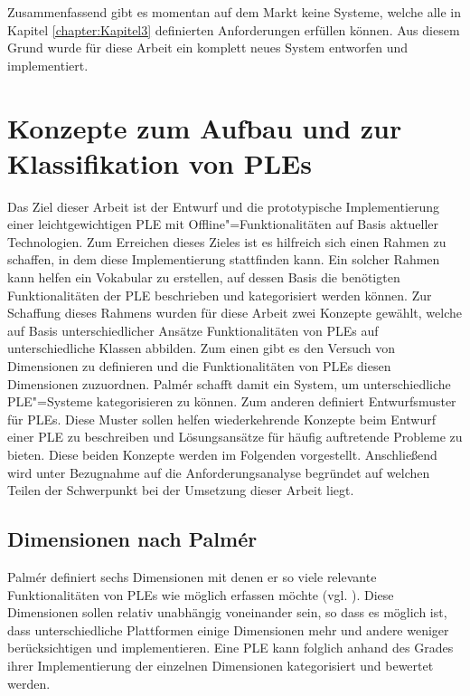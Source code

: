 Zusammenfassend gibt es momentan auf dem Markt keine Systeme, welche alle in Kapitel \ref{chapter:Kapitel3} definierten Anforderungen erfüllen können. Aus diesem Grund wurde für diese Arbeit ein komplett neues System entworfen und implementiert.

\section{Konzepte zum Aufbau und zur Klassifikation von \acsp{PLE}}
Das Ziel dieser Arbeit ist der Entwurf und die prototypische Implementierung einer leichtgewichtigen \ac{PLE} mit Offline"=Funktionalitäten auf Basis aktueller Technologien. Zum Erreichen dieses Zieles ist es hilfreich sich einen Rahmen zu schaffen, in dem diese Implementierung stattfinden kann. Ein solcher Rahmen kann helfen ein Vokabular zu erstellen, auf dessen Basis die benötigten Funktionalitäten der \ac{PLE} beschrieben und kategorisiert werden können. Zur Schaffung dieses Rahmens wurden für diese Arbeit zwei Konzepte gewählt, welche auf Basis unterschiedlicher Ansätze Funktionalitäten von \acp{PLE} auf unterschiedliche Klassen abbilden. Zum einen gibt es den Versuch von \cite{Palmer2009} Dimensionen zu definieren und die Funktionalitäten von \acp{PLE} diesen Dimensionen zuzuordnen. Palmér schafft damit ein System, um unterschiedliche \ac{PLE}"=Systeme kategorisieren zu können. Zum anderen definiert \cite{Wilson2008} Entwurfsmuster für \acp{PLE}. Diese Muster sollen helfen wiederkehrende Konzepte beim Entwurf einer \ac{PLE} zu beschreiben und Lösungsansätze für häufig auftretende Probleme zu bieten. Diese beiden Konzepte werden im Folgenden vorgestellt. Anschließend wird unter Bezugnahme auf die Anforderungsanalyse begründet auf welchen Teilen der Schwerpunkt bei der Umsetzung dieser Arbeit liegt.

\subsection{Dimensionen nach Palmér}\label{section:dimensions_palmer} 
Palmér definiert sechs Dimensionen mit denen er so viele relevante Funktionalitäten von \acp{PLE} wie möglich erfassen möchte (vgl. \cite{Palmer2009}). Diese Dimensionen sollen relativ unabhängig voneinander sein, so dass es möglich ist, dass unterschiedliche Plattformen einige Dimensionen mehr und andere weniger berücksichtigen und implementieren. Eine \ac{PLE} kann folglich anhand des Grades ihrer Implementierung der einzelnen Dimensionen kategorisiert und bewertet werden.

